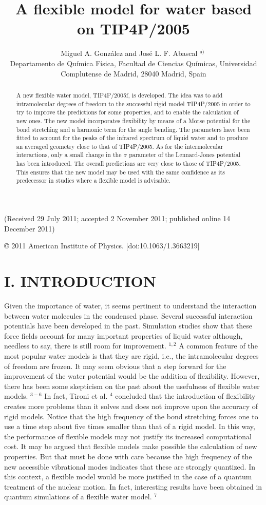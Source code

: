 \documentclass[10pt]{article}
\title{A flexible model for water based on TIP4P/2005 }
\author{Miguel A. González and José L. F. Abascal ${ }^{\text {a) }}$\\
Departamento de Química Física, Facultad de Ciencias Químicas, Universidad Complutense de Madrid, 28040 Madrid, Spain}
\date{}
\begin{document}
\maketitle
\captionsetup{singlelinecheck=false}
(Received 29 July 2011; accepted 2 November 2011; published online 14 December 2011)

\begin{abstract}
A new flexible water model, TIP4P/2005f, is developed. The idea was to add intramolecular degrees of freedom to the successful rigid model TIP4P/2005 in order to try to improve the predictions for some properties, and to enable the calculation of new ones. The new model incorporates flexibility by means of a Morse potential for the bond stretching and a harmonic term for the angle bending. The parameters have been fitted to account for the peaks of the infrared spectrum of liquid water and to produce an averaged geometry close to that of TIP4P/2005. As for the intermolecular interactions, only a small change in the $\sigma$ parameter of the Lennard-Jones potential has been introduced. The overall predictions are very close to those of TIP4P/2005. This ensures that the new model may be used with the same confidence as its predecessor in studies where a flexible model is advisable.
\end{abstract}

© 2011 American Institute of Physics. [doi:10.1063/1.3663219]

\section*{I. INTRODUCTION}
Given the importance of water, it seems pertinent to understand the interaction between water molecules in the condensed phase. Several successful interaction potentials have been developed in the past. Simulation studies show that these force fields account for many important properties of liquid water although, needless to say, there is still room for improvement. ${ }^{1,2}$ A common feature of the most popular water models is that they are rigid, i.e., the intramolecular degrees of freedom are frozen. It may seem obvious that a step forward for the improvement of the water potential would be the addition of flexibility. However, there has been some skepticism on the past about the usefulness of flexible water models. ${ }^{3-6}$ In fact, Tironi et al. ${ }^{4}$ concluded that the introduction of flexibility creates more problems than it solves and does not improve upon the accuracy of rigid models. Notice that the high frequency of the bond stretching forces one to use a time step about five times smaller than that of a rigid model. In this way, the performance of flexible models may not justify its increased computational cost. It may be argued that flexible models make possible the calculation of new properties. But that must be done with care because the high frequency of the new accessible vibrational modes indicates that these are strongly quantized. In this context, a flexible model would be more justified in the case of a quantum treatment of the nuclear motion. In fact, interesting results have been obtained in quantum simulations of a flexible water model. ${ }^{7}$
\end{document}
